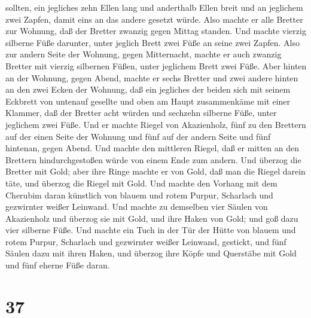 sollten,  ein jegliches zehn Ellen lang und anderthalb
Ellen breit  und an jeglichem zwei Zapfen, damit eins an
das andere gesetzt würde. Also machte er alle Bretter zur Wohnung,
 daß der Bretter zwanzig gegen Mittag standen.
 Und machte vierzig silberne Füße darunter, unter jeglich
Brett zwei Füße an seine zwei Zapfen.  Also zur andern
Seite der Wohnung, gegen Mitternacht, machte er auch zwanzig Bretter
 mit vierzig silbernen Füßen, unter jeglichem Brett zwei
Füße.  Aber hinten an der Wohnung, gegen Abend, machte er
sechs Bretter  und zwei andere hinten an den zwei Ecken der
Wohnung,  daß ein jegliches der beiden sich mit seinem
Eckbrett von untenauf gesellte und oben am Haupt zusammenkäme mit einer
Klammer,  daß der Bretter acht würden und sechzehn silberne
Füße, unter jeglichem zwei Füße.  Und er machte Riegel von
Akazienholz, fünf zu den Brettern auf der einen Seite der Wohnung
 und fünf auf der andern Seite und fünf hintenan, gegen
Abend.  Und machte den mittleren Riegel, daß er mitten an
den Brettern hindurchgestoßen würde von einem Ende zum andern.
 Und überzog die Bretter mit Gold; aber ihre Ringe machte
er von Gold, daß man die Riegel darein täte, und überzog die Riegel mit
Gold.  Und machte den Vorhang mit dem Cherubim daran
künstlich von blauem und rotem Purpur, Scharlach und gezwirnter weißer
Leinwand.  Und machte zu demselben vier Säulen von
Akazienholz und überzog sie mit Gold, und ihre Haken von Gold; und goß
dazu vier silberne Füße.  Und machte ein Tuch in der Tür
der Hütte von blauem und rotem Purpur, Scharlach und gezwirnter weißer
Leinwand, gestickt,  und fünf Säulen dazu mit ihren Haken,
und überzog ihre Köpfe und Querstäbe mit Gold und fünf eherne Füße
daran.

\hypertarget{section-36}{%
\section{37}\label{section-36}}

